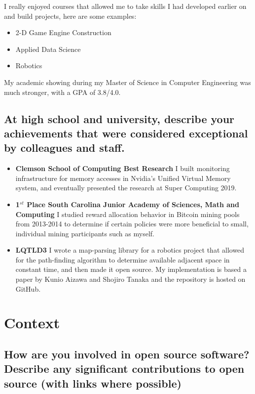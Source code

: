 \documentclass{article}
\begin{document}
I really enjoyed courses that allowed me to take skills I had developed earlier on and build projects, here are some examples:
\begin{itemize}
    \item 2-D Game Engine Construction
    \item Applied Data Science
    \item Robotics
\end{itemize}

My academic showing during my Master of Science in Computer Engineering was much stronger, with a GPA of 3.8/4.0.

\subsection{At high school and university, describe your achievements that were
    considered exceptional by colleagues and staff.}

\begin{itemize}
    \item \textbf{Clemson School of Computing Best Research}  I built monitoring infrastructure for
          memory accesses in Nvidia's Unified Virtual Memory system, and eventually
          presented the research at Super Computing 2019.
    \item \textbf{1$^{st}$ Place South Carolina Junior Academy of Sciences, Math
              and Computing} I studied reward allocation behavior in Bitcoin mining pools
          from 2013-2014 to determine if certain policies were more beneficial to
          small, individual mining participants such as myself.
    \item \textbf{LQTLD3} I wrote a map-parsing library for a robotics project
          that allowed for the path-finding algorithm to determine available adjacent
          space in constant time, and then made it open source. My implementation is based
          a paper by Kunio Aizawa and Shojiro Tanaka\cite{4538229} and the repository is hosted
          on GitHub\cite{lqtld3}.

\end{itemize}
\section{Context}
\subsection{How are you involved in open source software? Describe any
    significant contributions to open source (with links where possible)}
\end{document}
